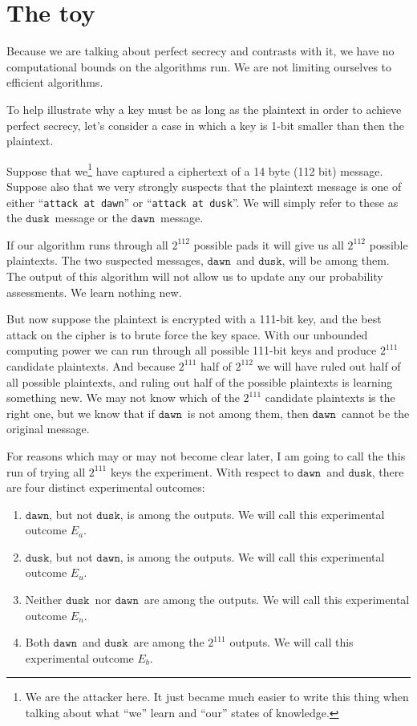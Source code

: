 \documentclass[11pt]{article}
\newcommand\mdusk{\ensuremath{\mathtt{dusk}}}
\newcommand\mdawn{\ensuremath{\mathtt{dawn}}}
\begin{document}
\section{The toy}

Because we are talking about perfect secrecy and contrasts with it, we have no computational bounds on the algorithms run. We are not limiting ourselves to efficient algorithms.

To help illustrate why a key must be as long as the plaintext in order to achieve perfect secrecy, let's consider a case in which a key is 1-bit smaller than then the plaintext.

Suppose that we\footnote{%
    We are the attacker here. It just became much easier to write this thing when talking about what \enquote{we} learn and \enquote{our} states of knowledge.
}
have captured a ciphertext of a 14 byte (112 bit) message.
Suppose also that we very strongly suspects that the plaintext message is one of either “\texttt{attack at dawn}” or “\texttt{attack at dusk}”.
We will simply refer to these as the \mdusk\ message or the \mdawn\ message.

If our algorithm runs through all $2^{112}$ possible pads it will give us all $2^{112}$ possible plaintexts.
The two suspected messages, \mdawn\ and \mdusk, will be among them.
The output of this algorithm will not allow us to update any our probability assessments. We learn nothing new.

But now suppose the plaintext is encrypted with a 111-bit key, and the best attack on the cipher is to brute force the key space.
With our unbounded computing power we can run through all possible 111-bit keys and produce $2^{111}$ candidate plaintexts.
And because $2^{111}$ half of $2^{112}$
we will have ruled out half of all possible plaintexts,
and ruling out half of the possible plaintexts is learning something new.
We may not know which of the $2^{111}$ candidate plaintexts is the right one, but we know that if \mdawn\ is not among them, then \mdawn\ cannot be the original message.

For reasons which may or may not become clear later, I am going to call the this run of trying all $2^{111}$ keys the experiment. 
With respect to \mdawn\ and \mdusk, there are four distinct experimental outcomes:

\begin{enumerate}
    \item\label{en:dawn} \mdawn, but not \mdusk, is among the outputs.
        We will call this experimental outcome $E_a$.
    \item\label{en:dusk} \mdusk, but not \mdawn, is among the outputs.
        We will call this experimental outcome $E_u$.
    \item\label{en:neither} Neither \mdusk\ nor \mdawn\ are among the outputs.
    We will call this experimental outcome $E_n$.
    \item\label{en:both} Both \mdawn\ and \mdusk\ are among the $2^{111}$ outputs.
    We will call this experimental outcome $E_b$.
\end{enumerate}
\end{document}

